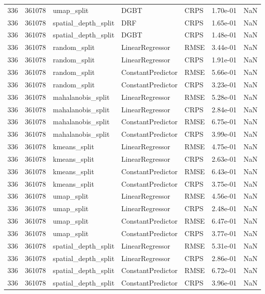 \begin{tabular}{rrlllrr}
336 & 361078 & umap\_split & DGBT & CRPS & 1.70e-01 & NaN \\
336 & 361078 & spatial\_depth\_split & DRF & CRPS & 1.65e-01 & NaN \\
336 & 361078 & spatial\_depth\_split & DGBT & CRPS & 1.48e-01 & NaN \\
336 & 361078 & random\_split & LinearRegressor & RMSE & 3.44e-01 & NaN \\
336 & 361078 & random\_split & LinearRegressor & CRPS & 1.91e-01 & NaN \\
336 & 361078 & random\_split & ConstantPredictor & RMSE & 5.66e-01 & NaN \\
336 & 361078 & random\_split & ConstantPredictor & CRPS & 3.23e-01 & NaN \\
336 & 361078 & mahalanobis\_split & LinearRegressor & RMSE & 5.28e-01 & NaN \\
336 & 361078 & mahalanobis\_split & LinearRegressor & CRPS & 2.84e-01 & NaN \\
336 & 361078 & mahalanobis\_split & ConstantPredictor & RMSE & 6.75e-01 & NaN \\
336 & 361078 & mahalanobis\_split & ConstantPredictor & CRPS & 3.99e-01 & NaN \\
336 & 361078 & kmeans\_split & LinearRegressor & RMSE & 4.75e-01 & NaN \\
336 & 361078 & kmeans\_split & LinearRegressor & CRPS & 2.63e-01 & NaN \\
336 & 361078 & kmeans\_split & ConstantPredictor & RMSE & 6.43e-01 & NaN \\
336 & 361078 & kmeans\_split & ConstantPredictor & CRPS & 3.75e-01 & NaN \\
336 & 361078 & umap\_split & LinearRegressor & RMSE & 4.56e-01 & NaN \\
336 & 361078 & umap\_split & LinearRegressor & CRPS & 2.48e-01 & NaN \\
336 & 361078 & umap\_split & ConstantPredictor & RMSE & 6.47e-01 & NaN \\
336 & 361078 & umap\_split & ConstantPredictor & CRPS & 3.77e-01 & NaN \\
336 & 361078 & spatial\_depth\_split & LinearRegressor & RMSE & 5.31e-01 & NaN \\
336 & 361078 & spatial\_depth\_split & LinearRegressor & CRPS & 2.86e-01 & NaN \\
336 & 361078 & spatial\_depth\_split & ConstantPredictor & RMSE & 6.72e-01 & NaN \\
336 & 361078 & spatial\_depth\_split & ConstantPredictor & CRPS & 3.96e-01 & NaN \\

\end{tabular}
